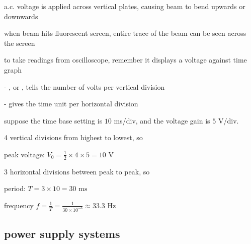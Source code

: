 a.c. voltage is applied across vertical plates, causing beam to bend upwards or downwards

when beam hits fluorescent screen, entire trace of the beam can be seen across the screen

\cmt to take readings from oscilloscope, remember it displays a voltage against time graph

\begin{compactenum}
	\item[-] , or , tells the number of volts per vertical division
	
	\item[-]  gives the time unit per horizontal division
\end{compactenum}




\label{ex-readcro}

\begin{marginfigure}
\centering
{}
\end{marginfigure}

suppose the time base setting is $10$ ms/div, and the voltage gain is $5$ V/div.
 
4 vertical divisions from highest to lowest, so

\eqskip peak voltage: $V_0= \frac{1}{2} \times 4 \times 5 = 10 \text{ V}$

3 horizontal divisions between peak to peak, so

\eqskip period: $T = 3 \times 10 = 30 \text{ ms}$
	
\eqskip frequency $f = \frac{1}{T} = \frac{1}{30\times10^{-3}} \approx 33.3 \text{ Hz} $ 






\subsection{power supply systems}

